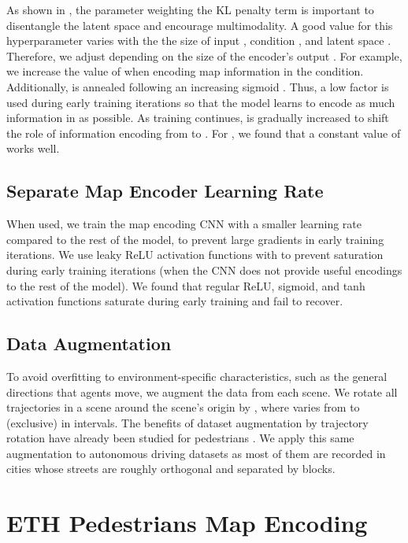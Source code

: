 \documentclass[runningheads]{llncs}
\begin{document}
As shown in \cite{HigginsMattheyEtAl2017}, the  parameter weighting the KL penalty term is important to disentangle the latent space and encourage multimodality. A good value for this hyperparameter varies with the the size of input , condition , and latent space . Therefore, we adjust  depending on the size of the encoder's output . For example, we increase the value of  when encoding map information in the condition. Additionally,  is annealed following an increasing sigmoid \cite{BowmanVilnisEtAl2015}. Thus, a low  factor is used during early training iterations so that the model learns to encode as much information in  as possible. As training continues,  is gradually increased to shift the role of information encoding from  to . For , we found that a constant value of  works well.

\subsection{Separate Map Encoder Learning Rate}
When used, we train the map encoding CNN with a smaller learning rate compared to the rest of the model, to prevent large gradients in early training iterations. We use leaky ReLU activation functions with  to prevent saturation during early training iterations (when the CNN does not provide useful encodings to the rest of the model). We found that regular ReLU, sigmoid, and tanh activation functions saturate during early training and fail to recover.

\subsection{Data Augmentation}

To avoid overfitting to environment-specific characteristics, such as the general directions that agents move, we augment the data from each scene. We rotate all trajectories in a scene around the scene's origin by , where  varies from  to  (exclusive) in  intervals. The benefits of dataset augmentation by trajectory rotation have already been studied for pedestrians \cite{SchollerAravantinosEtAl2020}. We apply this same augmentation to autonomous driving datasets as most of them are recorded in cities whose streets are roughly orthogonal and separated by blocks.

\section{ETH Pedestrians Map Encoding}
\end{document}

